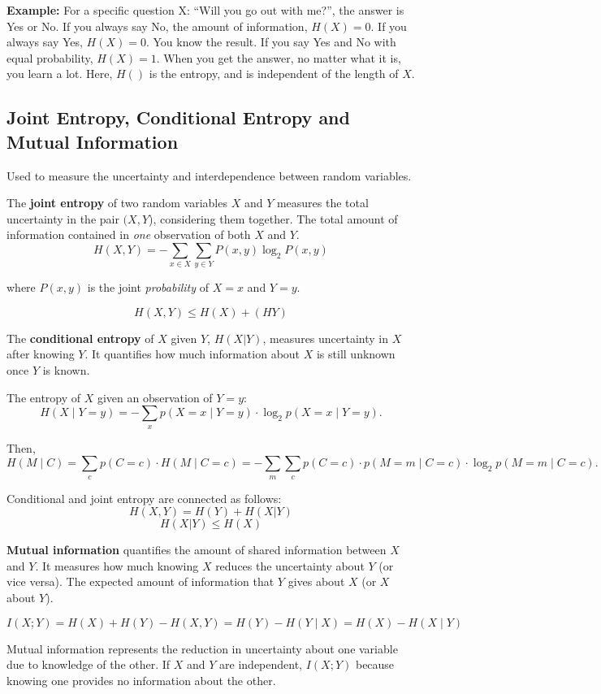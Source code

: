 \textbf{Example:} For a specific question X: ``Will you go out with me?'', the answer is Yes or No. If you always say No, the amount of information, $H(X) = 0$. If you always say Yes, $H(X) = 0$. You know the result. If you say Yes and No with equal probability, $H(X) = 1$. When you get the answer, no matter what it is, you learn a lot. Here, $H()$ is the entropy, and is independent of the length of $X$.

\subsection{Joint Entropy, Conditional Entropy and Mutual Information}
Used to measure the uncertainty and interdependence between random variables. 

\begin{defn}
    The \textbf{joint entropy} of two random variables $X$ and $Y$ measures the total uncertainty in the pair $(X,Y$), considering them together. The total amount of information contained in \emph{one} observation of both $X$ and $Y$. 
    \[
H(X, Y) = -\sum_{x \in X} \sum_{y \in Y} P(x, y) \log_2 P(x, y)
\]

where $P(x,y)$ is the joint \emph{probability} of $X=x$ and $Y=y$.

\[H(X,Y) \leq H(X) + (HY) \]
\end{defn}

\begin{defn}
The \textbf{conditional entropy} of $X$ given $Y$, $H(X|Y)$, measures uncertainty in $X$ after knowing $Y$. It quantifies how much information about $X$ is still unknown once $Y$ is known.

The entropy of $X$ given an observation of $Y=y$:
\[H(X \mid Y = y) = -\sum_{x} p(X = x \mid Y = y) \cdot \log_2 p(X = x \mid Y = y).
\]

Then,
\[H(M \mid C) = \sum_{c} p(C = c) \cdot H(M \mid C = c) 
= - \sum_{m} \sum_{c} p(C = c) \cdot p(M = m \mid C = c) \cdot \log_2 p(M = m \mid C = c). \]    
\end{defn}

\begin{defn}
    Conditional and joint entropy are connected as follows:
    \[H(X,Y) = H(Y) + H(X|Y) \]
    \[ H(X|Y) \leq H(X)\]
\end{defn}

\begin{defn}
\textbf{Mutual information} quantifies the amount of shared information between $X$ and $Y$. It measures how much knowing $X$ reduces the uncertainty about $Y$ (or vice versa). The expected amount of information that $Y$ gives about $X$ (or $X$ about $Y$).

\[
I(X; Y) = H(X) + H(Y) - H(X, Y) =  H(Y) - H(Y \mid X) = H(X) - H(X \mid Y)
\]

Mutual information represents the reduction in uncertainty about one variable due to knowledge of the other. If $X$ and $Y$ are independent, $I(X; Y)$ because knowing one provides no information about the other.
\end{defn}


